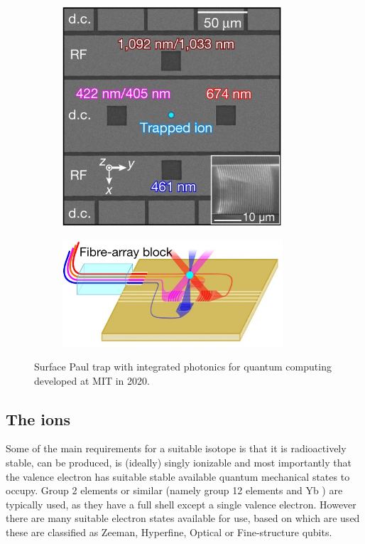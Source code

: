 \begin{figure}[H]
    \centering
    \begin{subfigure}[b]{0.45\textwidth}
        \centering
        \includegraphics[width=0.9\textwidth]{images/ITQC_MIT_1.jpg}
    \end{subfigure}
    \hfill
    \begin{subfigure}[b]{0.45\textwidth}
        \centering
        \includegraphics[width=0.9\textwidth]{images/ITQC_MIT_2.jpg}
    \end{subfigure}
    \caption{Surface Paul trap with integrated photonics for quantum computing developed at MIT in 2020.}\label{fig:ITQC_MIT}
\end{figure}

\subsection{The ions}
Some of the main requirements for a suitable isotope is that it is radioactively stable, can be produced, is (ideally) singly ionizable and most importantly that the valence electron has suitable stable available quantum mechanical states to occupy.
Group 2 elements or similar (namely group 12 elements and Yb \cite{ozeriTrappedionQubitTool2011}) are typically used, as they have a full shell except a single valence electron.
However there are many suitable electron states available for use, based on which are used these are classified as Zeeman, Hyperfine, Optical or Fine-structure qubits.


